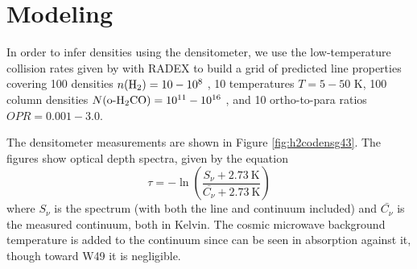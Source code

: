 \section{Modeling \formaldehyde}
In order to infer densities using the \formaldehyde densitometer, we use the
low-temperature collision rates given by \citet{Troscompt2009a} with RADEX
\citep{van-der-Tak2007a} to build a grid of predicted line properties covering
100 densities $n(\textrm{H}_{2}) = 10-10^8$ \percc, 10 temperatures $T=5-50$ K, 100 column densities
$N(\textrm{o-H}_2\textrm{CO}) = 10^{11}-10^{16}$ \persc, and 10 ortho-to-para ratios 
$OPR = 0.001-3.0$.

The \formaldehyde densitometer measurements are shown in Figure \ref{fig:h2codensg43}.
The figures show optical depth spectra, given by the equation
\begin{equation}
    \tau = -\ln\left(\frac{S_\nu + 2.73\mathrm{~K}}{\bar{C_\nu} + 2.73\mathrm{~K}}\right)
\end{equation}
where $S_\nu$ is the spectrum (with both the line and continuum included) and $\bar{C_\nu}$ is
the measured continuum, both in Kelvin.  The cosmic microwave background
temperature is added to the continuum since \formaldehyde can be seen in
absorption against it, though toward W49 it is negligible.

